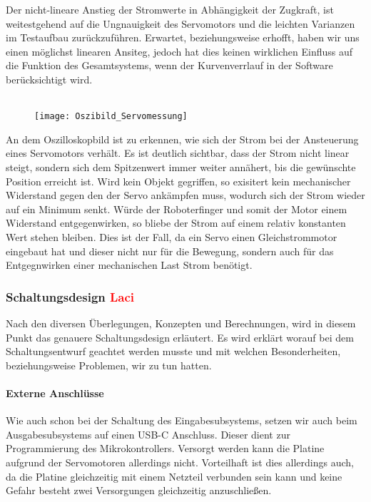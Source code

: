 \documentclass[titlepage,12pt,twoside]{article}
\begin{document}
\hfill \break
Der nicht-lineare Anstieg der Stromwerte in Abhängigkeit der Zugkraft, ist weitestgehend auf die Ungnauigkeit des Servomotors
und die leichten Varianzen im Testaufbau zurückzuführen. Erwartet, beziehungsweise erhofft, haben wir uns einen möglichst linearen
Ansiteg, jedoch hat dies keinen wirklichen Einfluss auf die Funktion des Gesamtsystems, wenn der Kurvenverrlauf in der Software
berücksichtigt wird. \\
\\
\begin{figure}[H]
	\begin{center}
		\scalebox{1.2}
		{\texttt{[image: Oszibild\_Servomessung]}}
	\end{center}
\end{figure}
\hfill \break
An dem Oszilloskopbild ist zu erkennen, wie sich der Strom bei der Ansteuerung eines Servomotors verhält. Es ist deutlich sichtbar,
dass der Strom nicht linear steigt, sondern sich dem Spitzenwert immer weiter annähert, bis die gewünschte Position erreicht ist.
Wird kein Objekt gegriffen, so exisitert kein mechanischer Widerstand gegen den der Servo ankämpfen muss, wodurch sich der Strom
wieder auf ein Minimum senkt. Würde der Roboterfinger und somit der Motor einem Widerstand entgegenwirken, so bliebe der Strom auf
einem relativ konstanten Wert stehen bleiben. Dies ist der Fall, da ein Servo einen Gleichstrommotor eingebaut hat und dieser nicht 
nur für die Bewegung, sondern auch für das Entgegnwirken einer mechanischen Last Strom benötigt. 

\subsubsection{Schaltungsdesign \textcolor{red}{Laci}}
Nach den diversen Überlegungen, Konzepten und Berechnungen, wird in diesem Punkt das genauere Schaltungsdesign erläutert. Es wird
erklärt worauf bei dem Schaltungsentwurf geachtet werden musste und mit welchen Besonderheiten, beziehungsweise Problemen, wir zu
tun hatten. 

\paragraph{Externe Anschlüsse}
\hfill \break
\hfill \break
Wie auch schon bei der Schaltung des Eingabesubsystems, setzen wir auch beim Ausgabesubsystems auf einen USB-C Anschluss.
Dieser dient zur Programmierung des Mikrokontrollers. Versorgt werden kann die Platine aufgrund der Servomotoren allerdings
nicht. Vorteilhaft ist dies allerdings auch, da die Platine gleichzeitig mit einem Netzteil verbunden sein kann und keine 
Gefahr besteht zwei Versorgungen gleichzeitig anzuschließen. 
\end{document}
